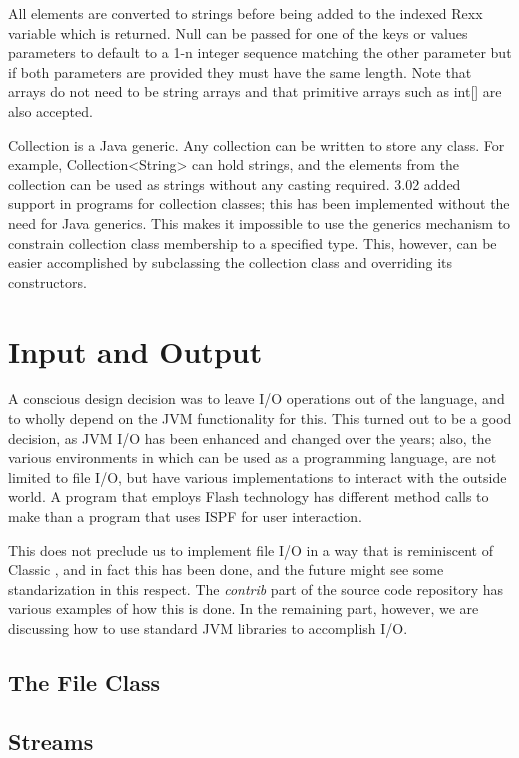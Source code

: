 All elements are converted to strings before being added to the indexed Rexx variable which is returned. Null can be passed for one of the keys or values parameters to default to a 1-n integer sequence matching the other parameter but if both parameters are provided they must have the same length. Note that arrays do not need to be string arrays and that primitive arrays such as int[] are also accepted.
\begin{shaded}
Collection is a Java generic. Any collection can be written to store any
class. For example, Collection<String> can hold strings, and the
elements from the collection can be used as strings without any
casting required. \nr{} 3.02 added  support in
\nr{} programs for collection classes; this has been implemented
without the need for Java generics. This makes it impossible to use
the generics mechanism to constrain collection class membership to a
specified type. This, however, can be easier accomplished by
subclassing the collection class and overriding its constructors.
\end{shaded}


 
\chapter{Input and Output}
A conscious design decision was to leave I/O operations out of the
language, and to wholly depend on the JVM functionality for this. This
turned out to be a good decision, as JVM I/O has been enhanced and
changed over the years; also, the various environments in which \nr{}
can be used as a programming language, are not limited to file I/O,
but have various implementations to interact with the outside world. A
\nr{} program that employs Flash technology has different method calls
to make than a program that uses ISPF for user interaction.

This does not preclude us to implement file I/O in a way that is
reminiscent of Classic \Rexx{}, and in fact this has been done, and
the future might see some standarization in this respect. The
\emph{contrib} part of the \nr{} source code repository has various
  examples of how this is done. In the remaining part, however, we are
  discussing how to use standard JVM libraries to accomplish I/O.
\section{The File Class}
\section{Streams}
